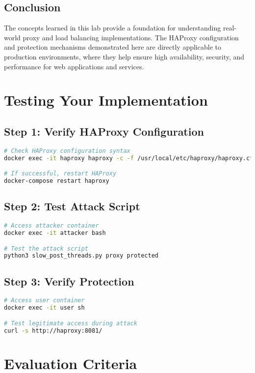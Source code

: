 \documentclass[12pt]{article}
\begin{document}
\subsection{Conclusion}
The concepts learned in this lab provide a foundation for understanding real-world proxy and load balancing implementations. The HAProxy configuration and protection mechanisms demonstrated here are directly applicable to production environments, where they help ensure high availability, security, and performance for web applications and services.

\section{Testing Your Implementation}

\subsection{Step 1: Verify HAProxy Configuration}
\begin{lstlisting}[language=bash]
# Check HAProxy configuration syntax
docker exec -it haproxy haproxy -c -f /usr/local/etc/haproxy/haproxy.cfg

# If successful, restart HAProxy
docker-compose restart haproxy
\end{lstlisting}

\subsection{Step 2: Test Attack Script}
\begin{lstlisting}[language=bash]
# Access attacker container
docker exec -it attacker bash

# Test the attack script
python3 slow_post_threads.py proxy protected
\end{lstlisting}

\subsection{Step 3: Verify Protection}
\begin{lstlisting}[language=bash]
# Access user container
docker exec -it user sh

# Test legitimate access during attack
curl -s http://haproxy:8081/
\end{lstlisting}

\section{Evaluation Criteria}
\end{document}
